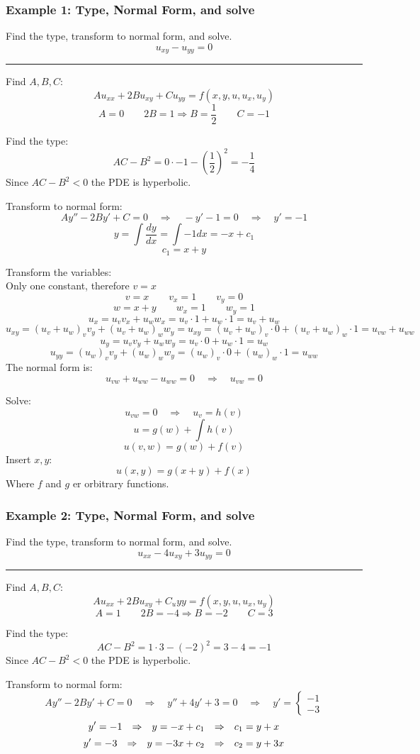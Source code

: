 \subsubsection{Example 1: Type, Normal Form, and solve}
Find the type, transform to normal form, and solve.
$$u_{xy}-u_{yy}=0$$

\rule{\textwidth}{0.5pt}

Find $A,B,C$:
$$Au_{xx}+2Bu_{xy}+Cu_{yy}=f(x,y,u,u_x,u_y)$$
$$A=0\qquad 2B=1\Rightarrow B=\frac{1}{2}\qquad C=-1$$

Find the type:
$$AC-B^2=0\cdot -1-\left(\frac{1}{2}\right)^2=-\frac{1}{4}$$
Since $AC-B^2<0$ the PDE is hyperbolic.

Transform to normal form:
$$Ay''-2By'+C=0\quad\Rightarrow\quad-y'-1=0\quad\Rightarrow\quad y'=-1$$
$$y=\int \frac{dy}{dx}=\int -1dx=-x+c_1$$
$$c_1=x+y$$

Transform the variables:\\
Only one constant, therefore $v=x$
$$v=x\qquad v_x=1\qquad v_y=0$$
$$w=x+y\qquad w_x=1\qquad w_y=1$$
$$u_x=u_v v_x+u_w w_x=u_v \cdot 1+u_w \cdot 1=u_v+u_w$$
$$u_{xy}=(u_v+u_w)_v v_y+(u_v+u_w)_w w_y=u_{xy}=(u_v+u_w)_v \cdot 0+(u_v+u_w)_w \cdot 1=\boxed{u_{vw}+u_{ww}}$$
$$u_y=u_v v_y + u_w w_y=u_v \cdot 0 + u_w \cdot 1=u_w$$
$$u_{yy}=(u_w)_v v_y+(u_w)_w w_y=(u_w)_v \cdot 0+(u_w)_w \cdot 1=\boxed{u_{ww}}$$
The normal form is:
$$u_{vw}+u_{ww}-u_{ww}=0\quad\Rightarrow\quad \boxed{u_{vw}=0}$$

Solve:
$$u_{vw}=0\quad\Rightarrow\quad u_v=h(v)$$
$$u=g(w)+\int h(v)$$
$$u(v,w)=g(w)+f(v)$$
Insert $x,y$:
$$u(x,y)=g(x+y)+f(x)$$
Where $f$ and $g$ er orbitrary functions.

\subsubsection{Example 2: Type, Normal Form, and solve}
Find the type, transform to normal form, and solve.
$$u_{xx}-4u_{xy}+3u_{yy}=0$$

\rule{\textwidth}{0.5pt}

Find $A,B,C$:
$$Au_{xx}+2Bu_{xy}+C_u{yy}=f(x,y,u,u_x,u_y)$$
$$A=1\qquad 2B=-4\Rightarrow B=-2\qquad C=3$$

Find the type:
$$AC-B^2=1\cdot 3-(-2)^2=3-4=-1$$
Since $AC-B^2<0$ the PDE is hyperbolic.

Transform to normal form:
$$Ay''-2By'+C=0\quad\Rightarrow\quad y''+4y'+3=0\quad\Rightarrow\quad y'=\begin{cases}
 -1\\
 -3
\end{cases}$$
$$y'=-1{\quad\Rightarrow\quad} y=-x+c_1{\quad\Rightarrow\quad} c_1=y+x$$
$$y'=-3{\quad\Rightarrow\quad} y=-3x+c_2{\quad\Rightarrow\quad} c_2=y+3x$$

